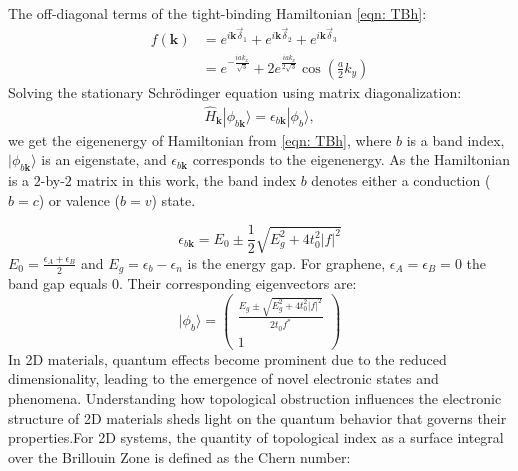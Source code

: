 The off-diagonal terms of the tight-binding Hamiltonian \ref{eqn: TBh}:
\begin{equation}
	\begin{aligned}
		f(\mathbf{k}) & =e^{i \mathbf{k} \vec{\delta}_{1}}+e^{i \mathbf{k} \vec{\delta}_{2}}+e^{i \mathbf{k} \vec{\delta}_{3}}  \\
		              & =e^{-\frac{i a k_{x}}{\sqrt{3}}}+2 e^{\frac{i a k_{x}}{2 \sqrt{3}}} \cos \left(\frac{a}{2} k_{y}\right)
	\end{aligned}
	\label{eqn:nearest_h}
\end{equation}
Solving the stationary Schrödinger equation using matrix diagonalization:
\begin{align}
	\hat{H}_{\mathbf{k}}|\phi_{b \mathbf{k}}\rangle = \epsilon_{b\mathbf{k}}|\phi_{b}\rangle,
	\label{eq:eqigenstates-h0}
\end{align}
we get the eigenenergy of Hamiltonian from \ref{eqn: TBh}, where $b$ is a band index, $|\phi_{b\mathbf{k}}\rangle$ is an eigenstate, and $\epsilon_{b\mathbf{k}}$ corresponds to the eigenenergy. As the Hamiltonian is a $2$-by-$2$ matrix in this work, the band index $b$ denotes either a conduction ($b=c$) or valence ($b=v$) state.

\begin{equation}
	\epsilon_{b\mathbf{k}}=E_{0} \pm \frac{1}{2} \sqrt{E_{g}^{2}+4t_{0}^{2}|f|^{2}}
	\label{eigenvalues}
\end{equation}
$E_{0}=\frac{\epsilon_{A}+\epsilon_{B}}{2}$ and $E_{g}=\epsilon_{b}-\epsilon_{n}$ is the energy gap. For graphene, $\epsilon_{A} = \epsilon_{B} =0$ the band gap equals 0.
Their corresponding eigenvectors are:
\begin{equation}
	|\phi_{b}\rangle  =\left(\begin{array}{cc}
			\frac{E_{g} \pm \sqrt{E_{g}^{2}+4t_{0}^{2}|f|^{2}}}{2t_{0} f^*} \\
			1
		\end{array}\right)
	\label{eqn:eigenvector}
\end{equation}
\color{red}
In 2D materials, quantum effects become prominent due to the reduced dimensionality, leading to the emergence of novel electronic states and phenomena. Understanding how topological obstruction influences the electronic structure of 2D materials sheds light on the quantum behavior that governs their properties.For 2D systems, the quantity of topological index as a surface integral over the Brillouin Zone is defined as the Chern number:

